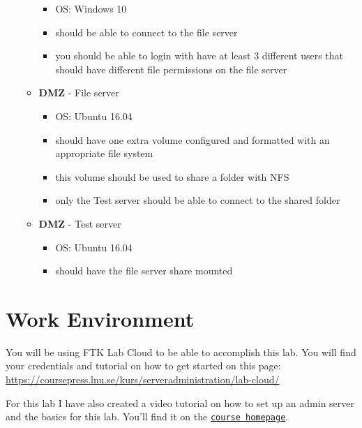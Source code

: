 \documentclass[paper=a4, fontsize=11pt]{report} %
\begin{document}
\begin{itemize}
\begin{itemize}
        \begin{itemize}
			\item OS: Windows 10
			\item should be able to connect to the file server
			\item you should be able to login with have at least 3 different users that should have different file permissions on the file server
        \end{itemize}
        \item \textbf{DMZ} - File server
        \begin{itemize}
			\item OS: Ubuntu 16.04
			\item should have one extra volume configured and formatted with an appropriate file system
			\item this volume should be used to share a folder with NFS
			\item only the Test server should be able to connect to the shared folder
        \end{itemize}
        \item \textbf{DMZ} - Test server
        \begin{itemize}
			\item OS: Ubuntu 16.04
			\item should have the file server share mounted
        \end{itemize}  
    \end{itemize}
\end{itemize}

\section{Work Environment}
\label{environment}

You will be using FTK Lab Cloud to be able to accomplish this lab. You will find your credentials and tutorial on how to get started on this page: \href{https://coursepress.lnu.se/kurs/serveradministration/lab-cloud/}{https://coursepress.lnu.se/kurs/serveradministration/lab-cloud/}

For this lab I have also created a video tutorial on how to set up an admin server and the basics for this lab. You'll find it on the \texttt{\href{https://coursepress.lnu.se/kurs/serveradministration/moduler/module-2/laboration}{course homepage}}.
\end{document}
